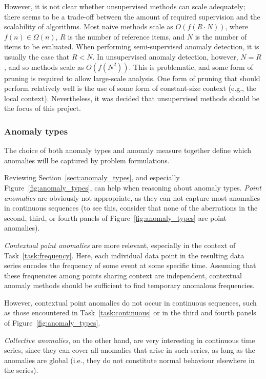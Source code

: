 However, it is not clear whether unsupervised methods can scale adequately; there seems to be a trade-off between the amount of required supervision and the scalability of algorithms. Most naive methods scale as $O(f(R \cdot N))$, where $f(n) \in \Omega(n)$, $R$ is the number of reference items, and $N$ is the number of items to be evaluated. When performing semi-supervised anomaly detection, it is usually the case that $R < N$. In unsupervised anomaly detection, however, $N = R$, and so methods scale as $O(f(N^2))$. This is problematic, and some form of pruning is required to allow large-scale analysis. One form of pruning that should perform relatively well is the use of some form of constant-size context (e.g.\@, the local context). Nevertheless, it was decided that unsupervised methods should be the focus of this project.

\subsubsection{Anomaly types}

The choice of both anomaly types and anomaly measure together define which anomalies will be captured by problem formulations.

Reviewing Section~\ref{sect:anomaly_types}, and especially Figure~\ref{fig:anomaly_types}, can help when reasoning about anomaly types. \emph{Point anomalies} are obviously not appropriate, as they can not capture most anomalies in continuous sequences (to see this, consider that none of the aberrations in the second, third, or fourth panels of Figure~\ref{fig:anomaly_types} are point anomalies).

\emph{Contextual point anomalies} are more relevant, especially in the context of Task~\ref{task:frequency}. Here, each individual data point in the resulting data series encodes the frequency of some event at some specific time. Assuming that these frequencies among points sharing context are independent, contextual anomaly methods should be sufficient to find temporary anomalous frequencies.

However, contextual point anomalies do not occur in continuous sequences, such as those encountered in Task~\ref{task:continuous} or in the third and fourth panels of Figure~\ref{fig:anomaly_types}.

\emph{Collective anomalies}, on the other hand, are very interesting in continuous time series, since they can cover all anomalies that arise in such series, as long as the anomalies are global (i.e.\@, they do not constitute normal behaviour elsewhere in the series).

